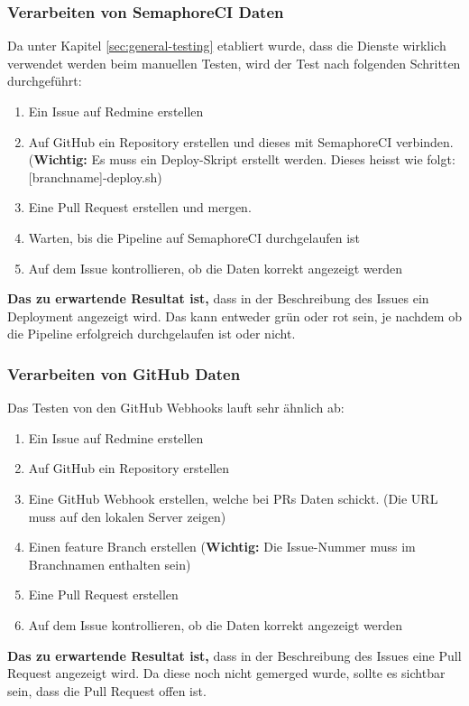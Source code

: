 \begin{minipage}{\textwidth}
  \subsubsection{Verarbeiten von SemaphoreCI Daten}
  Da unter Kapitel \ref{sec:general-testing} etabliert wurde, dass die Dienste wirklich verwendet werden beim manuellen Testen,
  wird der Test nach folgenden Schritten durchgeführt:
  \begin{enumerate}
    \item Ein Issue auf Redmine erstellen
    \item Auf GitHub ein Repository erstellen und dieses mit SemaphoreCI verbinden. 
    (\textbf{Wichtig:} Es muss ein Deploy-Skript erstellt werden. Dieses heisst wie folgt:
    [branchname]-deploy.sh)
    \item Eine Pull Request erstellen und mergen.
    \item Warten, bis die Pipeline auf SemaphoreCI durchgelaufen ist
    \item Auf dem Issue kontrollieren, ob die Daten korrekt angezeigt werden
  \end{enumerate}

  \textbf{Das zu erwartende Resultat ist,} dass in der Beschreibung des Issues ein Deployment angezeigt wird. Das kann entweder grün oder rot
  sein, je nachdem ob die Pipeline erfolgreich durchgelaufen ist oder nicht.
\end{minipage}

\begin{minipage}{\textwidth}
  \subsubsection{Verarbeiten von GitHub Daten}
  \label{sec:github-testing}
  Das Testen von den GitHub Webhooks lauft sehr ähnlich ab:
  \begin{enumerate}
    \item Ein Issue auf Redmine erstellen
    \item Auf GitHub ein Repository erstellen
    \item Eine GitHub Webhook erstellen, welche bei PRs Daten schickt. (Die URL muss auf den lokalen Server zeigen)
    \item Einen feature Branch erstellen (\textbf{Wichtig:} Die Issue-Nummer muss im Branchnamen enthalten sein)
    \item Eine Pull Request erstellen
    \item Auf dem Issue kontrollieren, ob die Daten korrekt angezeigt werden
  \end{enumerate}

  \textbf{Das zu erwartende Resultat ist,} dass in der Beschreibung des Issues eine Pull Request angezeigt wird. Da diese noch nicht gemerged
  wurde, sollte es sichtbar sein, dass die Pull Request offen ist.
\end{minipage}

